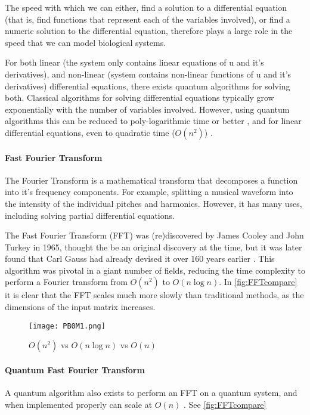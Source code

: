 \noindent
The speed with which we can either, find a solution to a differential equation (that is, find functions that represent each of the variables involved), or find a numeric solution to the differential equation, therefore plays a large role in the speed that we can model biological systems.

For both linear (the system only contains linear equations of u and it's derivatives), and non-linear (system contains non-linear functions of u and it's derivatives) differential equations, there exists quantum algorithms for solving both. Classical algorithms for solving differential equations typically grow exponentially with the number of variables involved. However, using quantum algorithms this can be reduced to poly-logarithmic time or better \cite{10.48550/arxiv.2011.06571,10.48550/arxiv.0812.4423}, and for linear differential equations, even to quadratic time ($O(n^{2})$) \cite{Berry_2014}.


{}
\paragraph*{Fast Fourier Transform}
\noindent
The Fourier Transform is a mathematical transform that decomposes a function into it's frequency components. For example, splitting a musical waveform into the intensity of the individual pitches and harmonics. However, it has many uses, including solving partial differential equations.

The Fast Fourier Transform (FFT) was (re)discovered by James Cooley and John Turkey in 1965, thought the be an original discovery at the time, but it was later found that Carl Gauss had already devised it over 160 years earlier \cite{cooley_tukey_1965}. This algorithm was pivotal in a giant number of fields, reducing the time complexity to perform a Fourier transform from $O(n^{2})$ to $O(n\log{n})$. In \autoref{fig:FFTcompare} it is clear that the FFT scales much more slowly than traditional methods, as the dimensions of the input matrix increases.

\begin{figure}[H]
	\centering
	\texttt{[image: PB0M1.png]}
	\caption{$O(n^{2})$ vs $O(n\log{n})$ vs $O(n)$}
	\label{fig:FFTcompare}
\end{figure}

{}
\paragraph*{Quantum Fast Fourier Transform}
\noindent
A quantum algorithm also exists to perform an FFT on a quantum system, and when implemented properly can scale at $O(n)$ \cite{asaka_sakai_yahagi_2020, Quantum-assisted}. See \autoref{fig:FFTcompare} \\ \\

